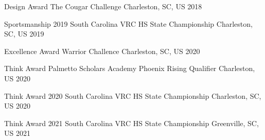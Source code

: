
\begin{cvhonors}

  \cvhonor
    {Design Award} %
    {The Cougar Challenge} %
    {Charleston, SC, US} %
    {2018} %

  \cvhonor
    {Sportsmanship} %
    {2019 South Carolina VRC HS State Championship} %
    {Charleston, SC, US} %
    {2019} %

  \cvhonor
    {Excellence Award} %
    {Warrior Challence} %
    {Charleston, SC, US} %
    {2020} %

  \cvhonor
    {Think Award} %
    {Palmetto Scholars Academy Phoenix Rising Qualifier} %
    {Charleston, US} %
    {2020} %

  \cvhonor
    {Think Award} %
    {2020 South Carolina VRC HS State Championship} %
    {Charleston, SC, US} %
    {2020} %

  \cvhonor
    {Think Award} %
    {2021 South Carolina VRC HS State Championship} %
    {Greenville, SC, US} %
    {2021} %

\end{cvhonors}
